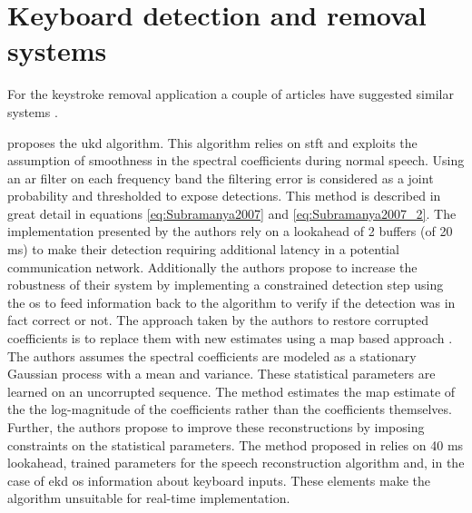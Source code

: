 %






\section{Keyboard detection and removal systems}
For the keystroke removal application a couple of articles have suggested similar systems \cite{Subramanya2007}\cite{Sugiyama2007}\cite{Abramson2007}\cite{Sugiyama2013}.

\cite{Subramanya2007} proposes the \gls{ukd} algorithm. This algorithm relies on \gls{stft} and exploits the assumption of smoothness in the spectral coefficients during normal speech. Using an \gls{ar} filter on each frequency band the filtering error is considered as a joint probability and thresholded to expose detections. This method is described in great detail in equations \ref{eq:Subramanya2007} and \ref{eq:Subramanya2007_2}. The implementation presented by the authors rely on a lookahead of 2 buffers (of 20 ms) to make their detection requiring additional latency in a potential communication network. Additionally the authors propose to increase the robustness of their system by implementing a constrained detection step using the \gls{os} to feed information back to the algorithm to verify if the detection was in fact correct or not. The approach taken by the authors to restore corrupted coefficients is to replace them with new estimates using a \gls{map} based approach \cite{Raj2004}. The authors assumes the spectral coefficients are modeled as a stationary Gaussian process with a mean and variance. These statistical parameters are learned on an uncorrupted sequence. The method estimates the \gls{map} estimate of the the log-magnitude of the coefficients rather than the coefficients themselves. Further, the authors propose to improve these reconstructions by imposing constraints on the statistical parameters.
The method proposed in \cite{Subramanya2007} relies on 40 ms lookahead, trained parameters for the speech reconstruction algorithm and, in the case of \gls{ekd} \gls{os} information about keyboard inputs. These elements make the algorithm unsuitable for real-time implementation.

